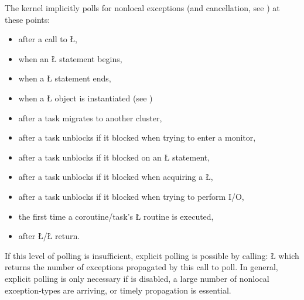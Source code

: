 \documentclass[openright,twoside]{report}
\begin{document}
The\label{p:ListPollingPoints} \uC kernel implicitly polls for nonlocal exceptions (and cancellation, see ) at these points:
\begin{itemize}[topsep=3pt,parsep=0pt,itemsep=0pt]
\item after a call to \LGinlinetrue\LGbegin\lgrinde\L{}\endlgrinde\LGend{},
\item when an \LGinlinetrue\LGbegin\lgrinde\L{}\endlgrinde\LGend{} statement begins,
\item when a \LGinlinetrue\LGbegin\lgrinde\L{}\endlgrinde\LGend{} statement ends,
\item when a \LGinlinetrue\LGbegin\lgrinde\L{}\endlgrinde\LGend{} object is instantiated (see ) 
\item after a task migrates to another cluster,
\item after a task unblocks if it blocked when trying to enter a monitor,
\item after a task unblocks if it blocked on an \LGinlinetrue\LGbegin\lgrinde\L{}\endlgrinde\LGend{} statement,
\item after a task unblocks if it blocked when acquiring a \LGinlinetrue\LGbegin\lgrinde\L{}\endlgrinde\LGend{},
\item after a task unblocks if it blocked when trying to perform I/O,
\item the first time a coroutine/task's \LGinlinetrue\LGbegin\lgrinde\L{}\endlgrinde\LGend{} routine is executed,
\item after \LGinlinetrue\LGbegin\lgrinde\L{}\endlgrinde\LGend{}/\LGinlinetrue\LGbegin\lgrinde\L{}\endlgrinde\LGend{} return.
\end{itemize}
If this level of polling is insufficient, explicit polling is possible by calling:
\LGinlinefalse\LGbegin\lgrinde
\L{}
\endlgrinde\LGend
{}%
%
which returns the number of exceptions propagated by this call to poll.
In general, explicit polling is only necessary if  is disabled, a large number of nonlocal exception-types are arriving, or timely propagation is essential.
\end{document}
